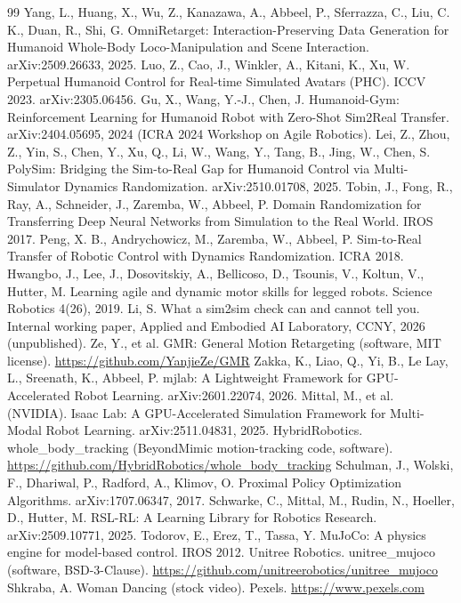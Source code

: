 \documentclass[11pt]{article}
\begin{document}
\begin{thebibliography}{99}
 Yang, L., Huang, X., Wu, Z., Kanazawa, A., Abbeel, P., Sferrazza, C., Liu, C. K., Duan, R., Shi, G. OmniRetarget: Interaction-Preserving Data Generation for Humanoid Whole-Body Loco-Manipulation and Scene Interaction. arXiv:2509.26633, 2025.
 Luo, Z., Cao, J., Winkler, A., Kitani, K., Xu, W. Perpetual Humanoid Control for Real-time Simulated Avatars (PHC). ICCV 2023. arXiv:2305.06456.
 Gu, X., Wang, Y.-J., Chen, J. Humanoid-Gym: Reinforcement Learning for Humanoid Robot with Zero-Shot Sim2Real Transfer. arXiv:2404.05695, 2024 (ICRA 2024 Workshop on Agile Robotics).
 Lei, Z., Zhou, Z., Yin, S., Chen, Y., Xu, Q., Li, W., Wang, Y., Tang, B., Jing, W., Chen, S. PolySim: Bridging the Sim-to-Real Gap for Humanoid Control via Multi-Simulator Dynamics Randomization. arXiv:2510.01708, 2025.
 Tobin, J., Fong, R., Ray, A., Schneider, J., Zaremba, W., Abbeel, P. Domain Randomization for Transferring Deep Neural Networks from Simulation to the Real World. IROS 2017.
 Peng, X. B., Andrychowicz, M., Zaremba, W., Abbeel, P. Sim-to-Real Transfer of Robotic Control with Dynamics Randomization. ICRA 2018.
 Hwangbo, J., Lee, J., Dosovitskiy, A., Bellicoso, D., Tsounis, V., Koltun, V., Hutter, M. Learning agile and dynamic motor skills for legged robots. Science Robotics 4(26), 2019.
 Li, S. What a sim2sim check can and cannot tell you. Internal working paper, Applied and Embodied AI Laboratory, CCNY, 2026 (unpublished).
 Ze, Y., et al. GMR: General Motion Retargeting (software, MIT license). \url{https://github.com/YanjieZe/GMR}
 Zakka, K., Liao, Q., Yi, B., Le Lay, L., Sreenath, K., Abbeel, P. mjlab: A Lightweight Framework for GPU-Accelerated Robot Learning. arXiv:2601.22074, 2026.
 Mittal, M., et al. (NVIDIA). Isaac Lab: A GPU-Accelerated Simulation Framework for Multi-Modal Robot Learning. arXiv:2511.04831, 2025.
 HybridRobotics. whole\_body\_tracking (BeyondMimic motion-tracking code, software). \url{https://github.com/HybridRobotics/whole_body_tracking}
 Schulman, J., Wolski, F., Dhariwal, P., Radford, A., Klimov, O. Proximal Policy Optimization Algorithms. arXiv:1707.06347, 2017.
 Schwarke, C., Mittal, M., Rudin, N., Hoeller, D., Hutter, M. RSL-RL: A Learning Library for Robotics Research. arXiv:2509.10771, 2025.
 Todorov, E., Erez, T., Tassa, Y. MuJoCo: A physics engine for model-based control. IROS 2012.
 Unitree Robotics. unitree\_mujoco (software, BSD-3-Clause). \url{https://github.com/unitreerobotics/unitree_mujoco}
 Shkraba, A. Woman Dancing (stock video). Pexels. \url{https://www.pexels.com}
\end{thebibliography}
\end{document}
